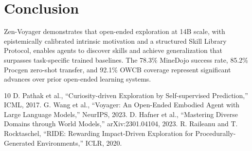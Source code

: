 \documentclass[11pt,a4paper]{article}
\begin{document}
\section{Conclusion}

Zen-Voyager demonstrates that open-ended exploration at 14B scale, with epistemically calibrated
intrinsic motivation and a structured Skill Library Protocol, enables agents to discover skills
and achieve generalization that surpasses task-specific trained baselines. The 78.3\% MineDojo
success rate, 85.2\% Procgen zero-shot transfer, and 92.1\% OWCB coverage represent significant
advances over prior open-ended learning systems.

\begin{thebibliography}{10}
 D. Pathak et al., ``Curiosity-driven Exploration by Self-supervised Prediction,'' ICML, 2017.
 G. Wang et al., ``Voyager: An Open-Ended Embodied Agent with Large Language Models,'' NeurIPS, 2023.
 D. Hafner et al., ``Mastering Diverse Domains through World Models,'' arXiv:2301.04104, 2023.
 R. Raileanu and T. Rocktaschel, ``RIDE: Rewarding Impact-Driven Exploration for Procedurally-Generated Environments,'' ICLR, 2020.
\end{thebibliography}
\end{document}
